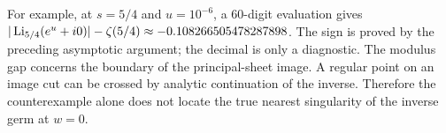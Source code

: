 For example, at $s=5/4$ and $u=10^{-6}$, a 60-digit evaluation gives
$|\operatorname{Li}_{5/4}(e^u+i0)|-\zeta(5/4)
\approx-0.108266505478287898$. The sign is proved by the preceding
asymptotic argument; the decimal is only a diagnostic.
The modulus gap concerns the boundary of the principal-sheet image.
A regular point on an image cut can be crossed by analytic continuation
of the inverse. Therefore the counterexample alone does not locate
the true nearest singularity of the inverse germ at $w=0$.
